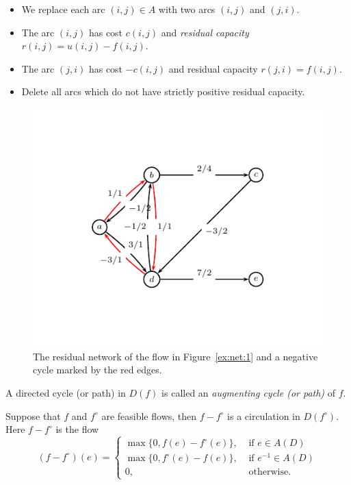   \begin{itemize}
  \item We replace each arc $(i,j) \in A$ with two arcs $(i,j)$ and
    $(j,i)$.
  \item The arc $(i,j)$ has cost $c{(i,j)}$ and \emph{residual capacity}
    $r{(i,j)} = u{(i,j)} - f{(i,j)}$.  
  \item The arc $(j,i)$    has cost $-c{(i,j)}$ and
    residual capacity $r{(j,i)}=f{(i,j)}$. 
  \item      Delete all arcs which do not have strictly positive residual
    capacity. 
  \end{itemize}

  

  \begin{figure}
  \centering
\includegraphics{figures/flows6.pdf}
\caption{The residual network of the flow in Figure~\ref{ex:net:1} and
a negative cycle marked by the red edges.} \label{ex:net:2}
\end{figure}



  A directed cycle (or path) in $D(f)$ is called an 
  \emph{augmenting cycle (or path)} of $f$.  

 
  \begin{lemma}
    \label{lem:6}
    Suppose that $f$ and $f^\circ$ are feasible flows, then 
    $f  - f^\circ$  is a circulation in $D(f^\circ)$.  Here $f  -
    f^\circ$ is the flow  
    \begin{displaymath}
      (f-f^\circ)(e) = 
      \begin{cases}
        \max\{0, f(e) - f^\circ(e)\}, & \text{ if } e \in  A(D)\\
        \max\{0, f^\circ(e) - f(e)\}, & \text{ if } e^{-1} \in  A(D)\\
        0, & \text{ otherwise.}
      \end{cases}
    \end{displaymath}
  \end{lemma}
   

